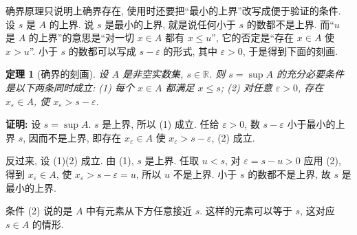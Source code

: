 \documentclass[UTF8,openany]{ctexbook}
\theoremstyle{chinesetextbook}
\newtheorem{theorem}{定理}[section]
\newenvironment{cnproof}{\par\indent\textbf{证明:} \ignorespaces}{\par}
\begin{document}
确界原理只说明上确界存在, 使用时还要把“最小的上界”改写成便于验证的条件. 设 $s$ 是 $A$ 的上界. 说 $s$ 是最小的上界, 就是说任何小于 $s$ 的数都不是上界. 而“$u$ 是 $A$ 的上界”的意思是“对一切 $x\in A$ 都有 $x\le u$”, 它的否定是“存在 $x\in A$ 使 $x>u$”. 小于 $s$ 的数都可以写成 $s-\varepsilon$ 的形式, 其中 $\varepsilon>0$, 于是得到下面的刻画.
\begin{theorem}[确界的刻画]
设 $A$ 是非空实数集, $s\in\mathbb R$. 则 $s=\sup A$ 的充分必要条件是以下两条同时成立: \textup{(1)} 每个 $x\in A$ 都满足 $x\le s$; \textup{(2)} 对任意 $\varepsilon>0$, 存在 $x_\varepsilon\in A$, 使 $x_\varepsilon>s-\varepsilon$.
\end{theorem}
\begin{cnproof}
设 $s=\sup A$. $s$ 是上界, 所以 (1) 成立. 任给 $\varepsilon>0$, 数 $s-\varepsilon$ 小于最小的上界 $s$, 因而不是上界, 即存在 $x_\varepsilon\in A$ 使 $x_\varepsilon>s-\varepsilon$, (2) 成立.

反过来, 设 (1)(2) 成立. 由 (1), $s$ 是上界. 任取 $u<s$, 对 $\varepsilon=s-u>0$ 应用 (2), 得到 $x_\varepsilon\in A$, 使 $x_\varepsilon>s-\varepsilon=u$, 所以 $u$ 不是上界. 小于 $s$ 的数都不是上界, 故 $s$ 是最小的上界.
\end{cnproof}
条件 (2) 说的是 $A$ 中有元素从下方任意接近 $s$. 这样的元素可以等于 $s$, 这对应 $s\in A$ 的情形.
\end{document}
